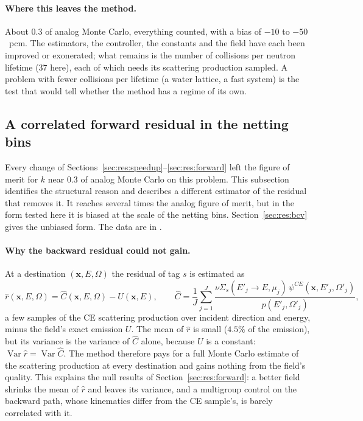 \paragraph{Where this leaves the method.} About $0.3$ of analog Monte Carlo, everything counted,
with a bias of $-10$ to $-50$~pcm. The estimators, the controller, the constants and the field
have each been improved or exonerated; what remains is the number of collisions per neutron
lifetime (37 here), each of which needs its scattering production sampled. A problem with fewer
collisions per lifetime (a water lattice, a fast system) is the test that would tell whether the
method has a regime of its own.

\subsection{A correlated forward residual in the netting bins}\label{sec:res:correlated}

Every change of Sections~\ref{sec:res:speedup}--\ref{sec:res:forward} left the figure of merit for
$k$ near $0.3$ of analog Monte Carlo on this problem. This subsection identifies the structural reason
and describes a different estimator of the residual that removes it. It reaches several times the
analog figure of merit, but in the form tested here it is biased at the scale of the netting bins.
Section~\ref{sec:res:bcv} gives the unbiased form. The data are in
.

\paragraph{Why the backward residual could not gain.} At a destination $(\mathbf x,E,\Omega)$ the
residual of tag $s$ is estimated as
\begin{equation}
\hat r(\mathbf x,E,\Omega)=\hat C(\mathbf x,E,\Omega)-U(\mathbf x,E),\qquad
\hat C=\frac1J\sum_{j=1}^{J}\frac{\nu\Sigma_s(E'_j\to E,\mu_j)\,\psi^{CE}(\mathbf x,E'_j,\Omega'_j)}{p(E'_j,\Omega'_j)},
\end{equation}
a few samples of the CE scattering production over incident direction and energy, minus the field's
exact emission $U$. The mean of $\hat r$ is small ($4.5\%$ of the emission), but its variance is the
variance of $\hat C$ alone, because $U$ is a constant: $\operatorname{Var}\hat r=\operatorname{Var}\hat C$.
The method therefore pays for a full Monte Carlo estimate of the scattering production at every
destination and gains nothing from the field's quality. This explains the null results of
Section~\ref{sec:res:forward}: a better field shrinks the mean of $\hat r$ and leaves its variance,
and a multigroup control on the backward path, whose kinematics differ from the CE sample's, is
barely correlated with it.

